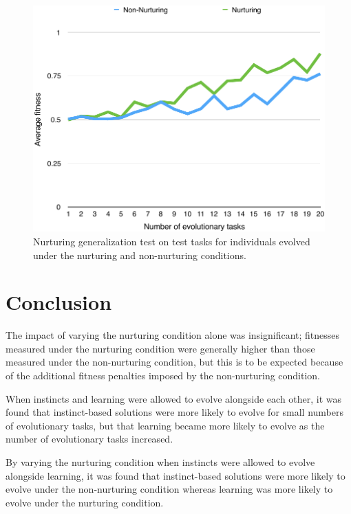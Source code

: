 \documentclass[master]{outhesis}
\begin{document}
\begin{figure}[H]
	\centering
	\includegraphics{NurturingGeneralizationTestPlot.pdf}
	\caption{Nurturing generalization test on test tasks for individuals evolved under the nurturing and non-nurturing conditions.}
\end{figure}

\chapter{Conclusion}

The impact of varying the nurturing condition alone was insignificant; fitnesses measured under the nurturing condition were generally higher than those measured under the non-nurturing condition, but this is to be expected because of the additional fitness penalties imposed by the non-nurturing condition.

When instincts and learning were allowed to evolve alongside each other, it was found that instinct-based solutions were more likely to evolve for small numbers of evolutionary tasks, but that learning became more likely to evolve as the number of evolutionary tasks increased.

By varying the nurturing condition when instincts were allowed to evolve alongside learning, it was found that instinct-based solutions were more likely to evolve under the non-nurturing condition whereas learning was more likely to evolve under the nurturing condition.

\makebackmatter
\end{document}
